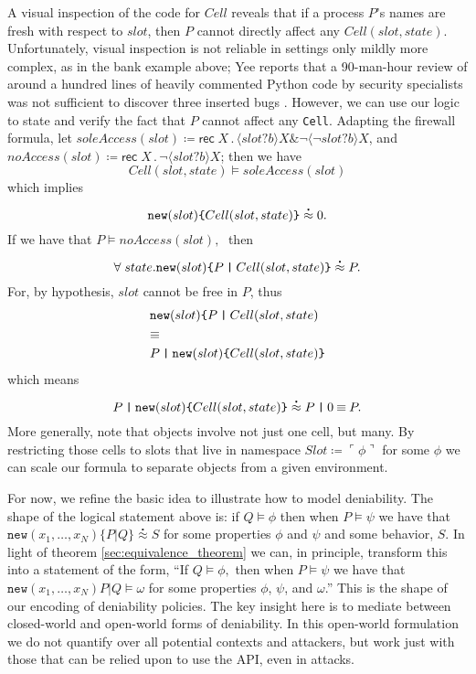 \documentclass[]{acm_proc_article-sp}
\newcommand{\lpquote}{\ulcorner}
\newcommand{\rpquote}{\urcorner}
\newcommand{\id}[1]{\texttt{#1}}
\newcommand{\juxtap}{\mathbin{\id{|}}}
\newcommand{\scong}{\mathbin{\equiv}}
\newcommand{\binpar}[2]{#1 \juxtap #2}
\newcommand{\defneqls}{\coloneqq}
\newcommand{\wbbisim}{\stackrel{\centerdot}{\approx}} %
\newcommand{\pquotep}[1]{\lpquote #1 \rpquote}
\newcommand{\pprefix}[3]{\langle #1 ? #2 \rangle #3}
\newcommand{\pgfp}[2]{\textsf{rec} \; #1 \mathbin{.} #2}
\numberwithin{equation}{subsection}
\begin{document}
A visual inspection of the code for $Cell$ reveals that if a process
$P$'s names are fresh with respect to $slot$, then $P$ cannot directly affect
any $Cell( slot, state )$. Unfortunately, visual inspection is not
reliable in settings only mildly more complex, as in the bank example
above; Yee reports that a 90-man-hour review of around a hundred lines
of heavily commented Python code by security specialists was not
sufficient to discover three inserted bugs \cite[Section
7]{Yee:EECS-2007-136}.  However, we can use our logic to state and
verify the fact that $P$ cannot affect any {\tt Cell}. Adapting the
firewall formula, let $soleAccess( slot ) \defneqls
\pgfp{X}{\pprefix{slot}{b}{X} \& \neg \pprefix{\neg slot}{b}{X}}$, and
$noAccess( slot ) \defneqls \pgfp{X}{\neg \pprefix{slot}{b}{X}}$; then
we have
\[Cell (slot, state) \models soleAccess( slot )\]
which implies
\[{\mbox{\tt new}(slot)\mbox{\tt \{} Cell(slot, state) \mbox{\tt \}}}
\wbbisim 0.\]
If we have that $P \models noAccess( slot ), \;$ then 
\[\forall \; state . \mbox{\tt new}(slot)\mbox{\tt \{}
\binpar{P}{Cell(slot, state)} \mbox{\tt \}}\wbbisim P.\]
For, by hypothesis, $slot$ cannot be free in $P$, thus
\begin{equation*}
  \begin{aligned}
    & \mbox{\tt new}(slot)\mbox{\tt \{} \binpar{P}{Cell(slot, state)} \\
    & \scong \\
    & \binpar{P}{\mbox{\tt new}(slot)\mbox{\tt \{} Cell(slot, state) \mbox{\tt \}}} \\
  \end{aligned}
\end{equation*}
\noindent which means
\[\binpar{P}{\mbox{\tt new}(slot)\mbox{\tt \{} Cell(slot, state)
  \mbox{\tt \}}} \wbbisim \binpar{P}{0} \scong P.\]
More generally, note that objects involve not just one cell, but
many. By restricting those cells to slots that live in namespace $Slot
\defneqls \pquotep{\phi}$ for some $\phi$ we can scale our formula to
separate objects from a given environment. 

For now, we refine the basic idea to illustrate how to model
deniability. The shape of the logical statement above is: if $Q
\models \phi$ then when $P \models \psi$ we have that
$\texttt{new}(x_1,\ldots,x_N)\{ \binpar{P}{Q} \} \wbbisim S$ for some
properties $\phi$ and $\psi$ and some behavior, $S$. In light of
theorem \ref{sec:equivalence_theorem} we can, in principle, transform
this into a statement of the form, ``If $Q \models \phi,$ then when $P
\models \psi$ we have that $\texttt{new}(x_1,\ldots,x_N)\binpar{P}{Q}
\models \omega$ for some properties $\phi$, $\psi$, and $\omega$.'' This
is the shape of our encoding of deniability policies. The key insight
here is to mediate between closed-world and open-world forms of
deniability. In this open-world formulation we do not quantify over
all potential contexts and attackers, but work just with those that
can be relied upon to use the API, even in attacks.
\end{document}
